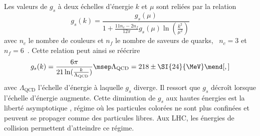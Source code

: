 \par Les valeurs de $g_s$ à deux échelles d'énergie $k$ et $\mu$ sont reliées par la relation
\begin{equation}
g_s(k) = \frac{g_s(\mu)}{1+ \frac{11n_c-2n_f}{12\pi} g_s(\mu)\ln(\frac{k^2}{\mu^2})}
\end{equation}
avec $n_c$ le nombre de couleurs et $n_f$ le nombre de saveurs de quarks, \ie\ $n_c=3$ et $n_f=6$~\cite{salam2010elements}.
Cette relation peut ainsi se réécrire
\begin{equation}
g_s (k) =
\frac{6\pi}{21 \ln(\frac{k}{\Lambda_\text{QCD}})}
\msep
\Lambda_\text{QCD} = 218\pm\SI{24}{\MeV}
\mend[,]
\end{equation}
avec $\Lambda_\text{QCD}$ l'échelle d'énergie à laquelle $g_s$ diverge.
Il ressort que $g_s$ décroît lorsque l'échelle d'énergie augmente.
Cette diminution de $g_s$ aux hautes énergies est la \og liberté asymptotique \fg, régime où les particules colorées ne sont plus confinées et peuvent se propager comme des particules libres. Aux LHC, les énergies de collision permettent d'atteindre ce régime.
